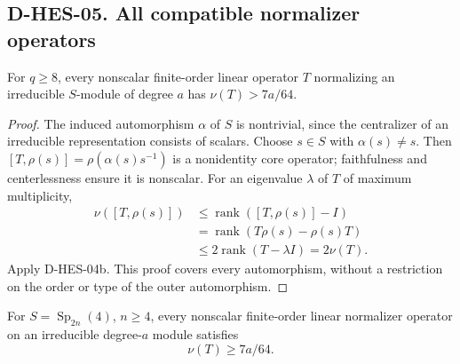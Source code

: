 \subsection*{D-HES-05. All compatible normalizer operators}

\begin{lemma}[D-HES-05a]
For $q\ge8$, every nonscalar finite-order linear operator $T$ normalizing
an irreducible $S$-module of degree $a$ has $\nu(T)>7a/64$.
\end{lemma}

\begin{proof}
The induced automorphism $\alpha$ of $S$ is nontrivial, since the
centralizer of an irreducible representation consists of scalars.
Choose $s\in S$ with $\alpha(s)\ne s$. Then
$[T,\rho(s)]=\rho(\alpha(s)s^{-1})$ is a nonidentity core operator;
faithfulness and centerlessness ensure it is nonscalar. For an
eigenvalue $\lambda$ of $T$ of maximum multiplicity,
\[
 \begin{split}
 \nu([T,\rho(s)])
 &\le\operatorname{rank}([T,\rho(s)]-I)\\
 &=\operatorname{rank}(T\rho(s)-\rho(s)T)\\
 &\le2\operatorname{rank}(T-\lambda I)=2\nu(T).
 \end{split}
\]
Apply D-HES-04b. This proof covers every automorphism, without a
restriction on the order or type of the outer automorphism.
\end{proof}

\begin{lemma}
For $S=\operatorname{Sp}_{2n}(4)$, $n\ge4$, every nonscalar finite-order
linear normalizer operator on an irreducible degree-$a$ module satisfies
\[
                              \nu(T)\ge7a/64.
\tag{HES.20}
\]
\end{lemma}

